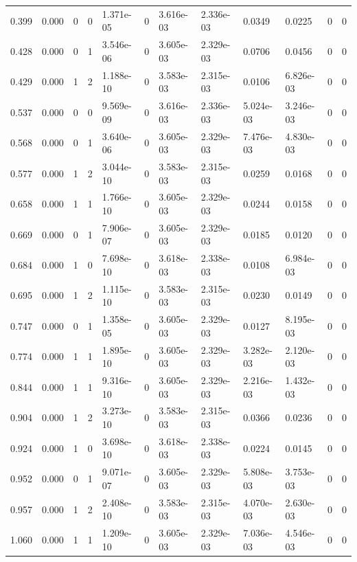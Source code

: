 \documentclass[preview]{standalone}
\begin{document}
{{\begin{tabular}{L{1.2cm}C{1.2cm} C{0.3cm}C{0.5cm} C{1.4cm}C{1.4cm} C{1.4cm}C{1.4cm} C{1.6cm}C{1.6cm} C{1.6cm}C{1.6cm}}
  0.399  &  0.000  & 0     &  0 &  1.371e-05  & 0  &  3.616e-03&   2.336e-03& 0.0349 & 0.0225   &  0 & 0  \\ 
  0.428  &  0.000  & 0     &  1 &  3.546e-06  & 0  &  3.605e-03&   2.329e-03& 0.0706 & 0.0456   &  0 & 0  \\ 
  0.429  &  0.000  & 1     &  2 &  1.188e-10  & 0  &  3.583e-03&   2.315e-03& 0.0106 & 6.826e-03   &  0 & 0  \\ 
  0.537  &  0.000  & 0     &  0 &  9.569e-09  & 0  &  3.616e-03&   2.336e-03& 5.024e-03 & 3.246e-03   &  0 & 0  \\ 
  0.568  &  0.000  & 0     &  1 &  3.640e-06  & 0  &  3.605e-03&   2.329e-03& 7.476e-03 & 4.830e-03   &  0 & 0  \\ 
  0.577  &  0.000  & 1     &  2 &  3.044e-10  & 0  &  3.583e-03&   2.315e-03& 0.0259 & 0.0168   &  0 & 0  \\ 
  0.658  &  0.000  & 1     &  1 &  1.766e-10  & 0  &  3.605e-03&   2.329e-03& 0.0244 & 0.0158   &  0 & 0  \\ 
  0.669  &  0.000  & 0     &  1 &  7.906e-07  & 0  &  3.605e-03&   2.329e-03& 0.0185 & 0.0120   &  0 & 0  \\ 
  0.684  &  0.000  & 1     &  0 &  7.698e-10  & 0  &  3.618e-03&   2.338e-03& 0.0108 & 6.984e-03   &  0 & 0  \\ 
  0.695  &  0.000  & 1     &  2 &  1.115e-10  & 0  &  3.583e-03&   2.315e-03& 0.0230 & 0.0149   &  0 & 0  \\ 
  0.747  &  0.000  & 0     &  1 &  1.358e-05  & 0  &  3.605e-03&   2.329e-03& 0.0127 & 8.195e-03   &  0 & 0  \\ 
  0.774  &  0.000  & 1     &  1 &  1.895e-10  & 0  &  3.605e-03&   2.329e-03& 3.282e-03 & 2.120e-03   &  0 & 0  \\ 
  0.844  &  0.000  & 1     &  1 &  9.316e-10  & 0  &  3.605e-03&   2.329e-03& 2.216e-03 & 1.432e-03   &  0 & 0  \\ 
  0.904  &  0.000  & 1     &  2 &  3.273e-10  & 0  &  3.583e-03&   2.315e-03& 0.0366 & 0.0236   &  0 & 0  \\ 
  0.924  &  0.000  & 1     &  0 &  3.698e-10  & 0  &  3.618e-03&   2.338e-03& 0.0224 & 0.0145   &  0 & 0  \\ 
  0.952  &  0.000  & 0     &  1 &  9.071e-07  & 0  &  3.605e-03&   2.329e-03& 5.808e-03 & 3.753e-03   &  0 & 0  \\ 
  0.957  &  0.000  & 1     &  2 &  2.408e-10  & 0  &  3.583e-03&   2.315e-03& 4.070e-03 & 2.630e-03   &  0 & 0  \\ 
  1.060  &  0.000  & 1     &  1 &  1.209e-10  & 0  &  3.605e-03&   2.329e-03& 7.036e-03 & 4.546e-03   &  0 & 0  \\ 

\end{tabular}}}
\end{document}
